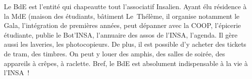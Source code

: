 Le BdE est l'entité qui chapeautte tout l'associatif Insalien. Ayant élu résidence à
la MdE (maison des étudiants, bâtiment Le~Thélème, il organise notamment le
Gala, l'intégration de premières années, peut dépanner avec la COOP, l'épicerie
étudiante, publie le Bot'INSA, l'annuaire des assos de l'INSA, l'agenda.
Il gère aussi les laveries, les photocopieurs.
De plus, il est possible d'y acheter des tickets de tram, des timbres.
On peut y louer des amphis, des salles de soirée, des appareils à
crêpes, à raclette.
Bref, le BdE est absolument indispensable à la vie à l'INSA~!

